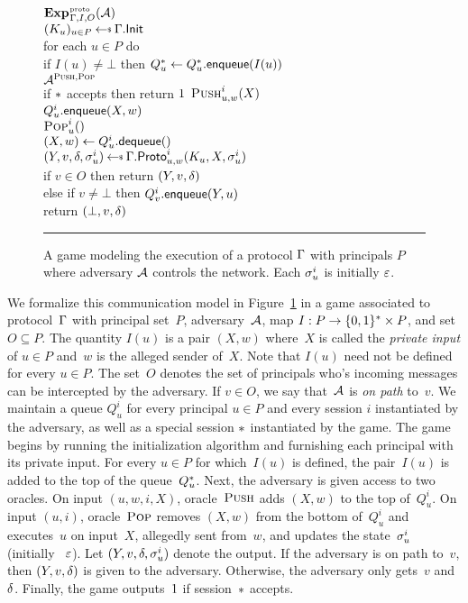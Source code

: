 \begin{figure}[t]
  {
    \underline{$\game{\protosec}_{\protocol,I,O}(\advA)$}\\[2pt]
      $(K_u)_{u\in P} \getsr \protocol.\init$\\
      for each $u \in P$ do\\
      \ind if $I(u) \ne \bot$ then $Q_u^* \gets Q_u^*.\mathsf{enqueue}(I(u))$\\
      $\mathcal{A}^{\textsc{Push},\textsc{Pop}}$\\
      if $*$ accepts then return $1$
  }
  {
    \underline{$\textsc{Push}_{u,w}^i(X)$}\\[2pt]
      $Q_u^i.\mathsf{enqueue}(X, w)$
    \\[6pt]
    \underline{$\textsc{Pop}_u^i()$}\\[2pt]
      $(X, w) \gets Q_u^i.\mathsf{dequeue}()$\\
      $(Y, v, \verdict, \st_u^i) \getsr \protocol.\proto_{u,w}^i(K_u, X, \st_u^i)$\\
      if $v \in O$ then return $(Y, v, \delta)$\\
      else if $v \ne \bot$ then $Q_v^i.\mathsf{enqueue}(Y, u)$\\
      return $(\bot, v, \delta)$
  }
  \caption{A game modeling the execution of a protocol $\mathrm{\Gamma}$ with
  principals $P$ where adversary $\mathcal{A}$ controls the network. Each $\sigma_u^i$ is
  initially $\varepsilon$.}
  \vspace{6pt}\hrule
  \label{fig-proto}
\end{figure}
We formalize this communication model in Figure~\ref{fig-proto} in a game
associated to protocol~$\mathrm{\Gamma}$ with principal set~$P$,
adversary~$\mathcal{A}$,
map $I : P \to \{0,1\}^* \times P$, and
set $O \subseteq P$.
The quantity $I(u)$ is a pair $(X, w)$ where~$X$ is called the \emph{private
input} of $u\in P$ and~$w$ is the alleged sender of~$X$. Note that $I(u)$ need
not be defined for every $u \in P$.
The set~$O$ denotes the set of principals who's incoming messages can be
intercepted by the adversary. If $v \in O$, we say that~$\mathcal{A}$ is \emph{on
path} to~$v$.
%
We maintain a queue $Q_u^i$ for every principal $u \in P$ and every session $i$
instantiated by the adversary, as well as a special session $*$ instantiated
by the game.
%
The game begins by running the initialization algorithm and furnishing each
principal with its private input. For every $u \in P$ for which~$I(u)$ is
defined, the pair~$I(u)$ is added to the top of the queue~$Q_u^*$.
%
Next, the adversary is given access to two oracles. On input $(u, w, i, X)$,
oracle~$\textsc{Push}$ adds $(X, w)$ to the top of~$Q_u^i$. On input $(u, i)$,
oracle~$\textsc{Pop}$ removes $(X, w)$ from the bottom of~$Q_u^i$ and executes~$u$ on
input~$X$, allegedly sent from~$w$, and updates the state~$\sigma_u^i$ (initially
~$\varepsilon$). Let $(Y, v, \delta, \sigma_u^i)$ denote the output.
If the adversary is on path to~$v$, then $(Y, v, \delta)$ is given to the
adversary. Otherwise, the adversary only gets~$v$ and~$\delta$.  Finally, the
game outputs~$1$ if session~$*$ accepts.

